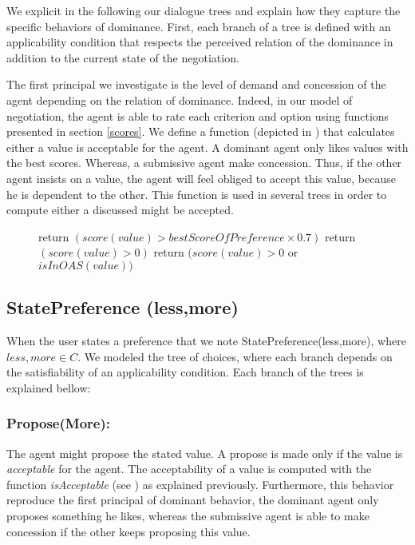 \documentclass{llncs}
\begin{document}
\par We explicit in the following our dialogue trees and explain how they capture the specific behaviors of dominance. First, each branch of a tree  is defined with an applicability condition that respects the perceived relation of the dominance in addition to the current state of the negotiation. 

\par The first principal we investigate is the level of demand and concession of the agent depending on the relation of dominance. Indeed, in our model of negotiation, the agent is able to rate each criterion and option using functions presented in section \ref{scores}. We define a function (depicted in ) that calculates either a value is acceptable for the agent. A dominant agent only likes values with the best scores. Whereas, a submissive agent make concession. Thus, if the other agent insists on a value, the agent will feel obliged to accept this value, because he is dependent to the other. This function is used in several trees in order to compute either a discussed might be accepted.

 	\begin{figure}[]
 		\begin{algorithmic}[1]\small
 			
 			\State return $(score(value)> bestScoreOfPreference \times 0.7)$
 			\EndIf
 			\State return $(score(value)> 0)$
 			\EndIf
 			\State return $(score(value)> 0$  or $isInOAS(value))$
 			\EndIf
 			\EndFunction
 		\end{algorithmic}
 		\vskip 8pt
 	\end{figure} 
 	
\subsection{StatePreference (less,more)}
When the user states a preference that we note StatePreference(less,more), where $less, more \in C$.  We modeled the tree of choices, where each branch depends on the satisfiability of an applicability condition. Each branch of the trees is explained bellow:
 		\subsubsection{Propose(More):} The agent might propose the stated value. A propose is made only if the value is \emph{acceptable} for the agent. The acceptability of a value is computed with the function \emph{isAcceptable} (see ) as explained previously. Furthermore, this behavior reproduce the first principal of dominant behavior, the dominant agent only proposes something he likes, whereas the submissive agent is able to make concession if the other keeps proposing this value. 
 		
\end{document}
